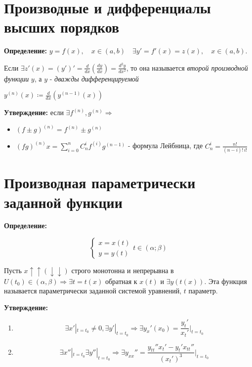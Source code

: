 \documentclass[fleqn, 12pt]{article}
\begin{document}
\section{Производные и дифференциалы высших порядков}
\textbf{Определение:} \(y = f(x), \quad x \in (a, b)
\quad \exists y' = f'(x) = z(x), \quad x \in (a, b). \)

Если $\exists z'(x) = (y')' = \frac{d}{dx}(\frac{dy}{dx}) = \frac{d^2 y}{d x^2}$,
то она называется \textit{второй производной функции} $y$, а $y$ -
\textit{дважды дифференцируемой}

\(y^{(n)}(x) \coloneqq \frac{d}{dx}(y^{(n-1)}(x))\)

\textbf{Утверждение:} если $\exists f^(n), g^(n) \Rightarrow $
\begin{itemize}
	\item $(f \pm g)^{(n)} = f^{(n)} \pm g^{(n)}$
	\item $(f g)^(n) x = \sum_{i=0}^{n} C^i_n f^{(i)} g^{(n - 1)} $ - формула Лейбница, где
	      $C^i_n = \frac{n!}{(n - i)!\,i!}$
\end{itemize}

\section{Производная параметрически заданной функции}
\textbf{Определение:}

\[
	\begin{cases}
		x = x(t) \\
		y = y(t)
	\end{cases}
	t \in (\alpha; \beta)
\]

Пусть $x \uparrow\uparrow (\downarrow\downarrow) $ строго монотонна и непрерывна в
$U(t_0) \in (\alpha, \beta) \Rightarrow \exists t = t(x) $ обратная к $x(t)$ и
$\exists y(t(x))$. Эта функция называется параметрически заданной системой
уравнений, $t$ параметр.

\textbf{Утверждение:}
\begin{enumerate}
	\item \begin{displaymath}
		      \exists x'|_{t=t_0} \ne 0,
		      \exists y'|_{t=t_0} \Rightarrow
		      \exists y_x'(x_0) = \frac{y_t'}{x_t'}\Bigr|_{t=t_0}
	      \end{displaymath}
	\item \begin{displaymath}
		      \exists x''|_{t=t_0}
		      \exists y''|_{t=t_0} \Rightarrow
		      \exists y_{xx}'' = \frac{y_{tt}'' x_t' - y_t' x_{tt}''}{(x_t')^3}\Bigr|_{t=t_0}
	      \end{displaymath}
\end{enumerate}
\end{document}
